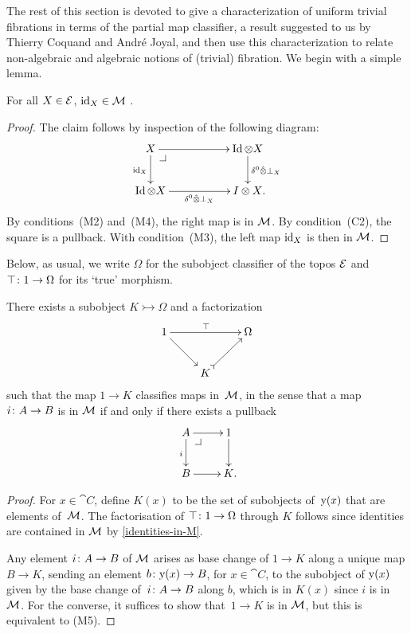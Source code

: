 \documentclass[reqno,10pt,a4paper,oneside,draft]{amsart}
\begin{document}
{{The rest of this section is devoted to give a characterization of uniform trivial fibrations in terms of the partial map classifier, a result suggested to us by Thierry Coquand and Andr\'e Joyal, and then use this characterization to relate non-algebraic and algebraic notions of (trivial) fibration.
We begin with a simple lemma.

\begin{lemma} \label{identities-in-M}
For all $X \in \cal{E}$, $\id_X \in \cal{M}$ .
\end{lemma}

\begin{proof}
The claim follows by inspection of the following diagram:
\[
\xymatrix@C+3em{
  X
  \ar[r]
  \ar[d]_{\id_X}
  \pullback{dr}
&
  \Id \otimes X
  \ar[d]^{\delta^0 \hatotimes \bot_X}
\\
  \Id \otimes X
  \ar[r]_{\delta^0 \hatotimes \bot_X}
&
  I \otimes X
\rlap{.}}
\]
By conditions~(M2) and~(M4), the right map is in $\cal{M}$.
By condition~(C2), the square is a pullback.
With condition~(M3), the left map $\id_X$ is then in $\cal{M}$.
\end{proof}

Below, as usual, we write $\Omega$ for the subobject classifier of the topos $\cal{E}$ and $\top \co 1 \to \Omega$ for its `true' morphism.

\begin{lemma} \label{partial-map-classifier}
There exists a subobject $K \rightarrowtail \Omega$ and a factorization
\[
\xymatrix{
  1
  \ar[rr]^\top
  \ar[dr]
&&
  \Omega
\\
&
  K
  \ar@{>->}[ur]
}
\]
such that the map $1 \to K$ classifies maps in~$\cal{M}$, in the sense that a map
$i \co A \to B$ is in $\cal{M}$ if and only if there exists a pullback
\[
\xymatrix{
  A
  \ar[r]
  \ar[d]_i
  \drpullback
&
  1
  \ar[d]
\\
  B
  \ar[r]
&
  K
\rlap{.}}
\]
\end{lemma}

\begin{proof}
For $x \in \cat{C}$, define $K(x)$ to be the set of subobjects of~$\yon(x)$ that are elements of~$\cal{M}$.
The factorisation of $\top \co 1 \to \Omega$ through $K$ follows since identities are contained in $\cal{M}$ by \cref{identities-in-M}.

Any element $i \co A \to B$ of $\cal{M}$ arises as base change of $1 \to K$ along a unique map $B \to K$, sending an element $b \co \yon(x) \to B$, for $x \in \cat{C}$, to the subobject of $\yon(x)$ given by the base change of~$i \co A  \to B$ along $b$, which is in $K(x)$ since $i$ is in $\cal{M}$.
For the converse, it suffices to show that~$1 \to K$ is in $\cal{M}$, but this is equivalent to (M5).
\end{proof}

}}
\end{document}
